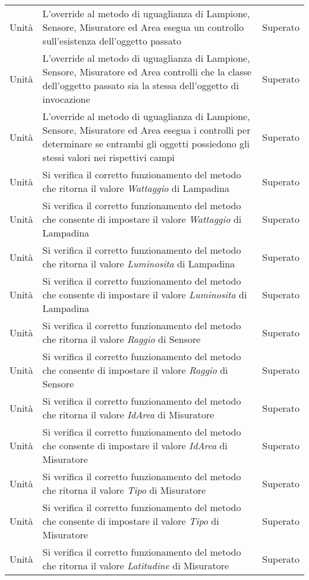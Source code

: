 \begin{center}
\begin{xltabular}{\linewidth}{|l|X|l|}
        Unità & L'override al metodo di uguaglianza di Lampione, Sensore, Misuratore ed Area esegua un controllo sull'esistenza dell'oggetto passato & Superato\\
        Unità & L'override al metodo di uguaglianza di Lampione, Sensore, Misuratore ed Area controlli che la classe dell'oggetto passato sia la stessa dell'oggetto di invocazione & Superato\\
        Unità & L'override al metodo di uguaglianza di Lampione, Sensore, Misuratore ed Area esegua i controlli per determinare se entrambi gli oggetti possiedono gli stessi valori nei rispettivi campi & Superato\\
        Unità & Si verifica il corretto funzionamento del metodo che ritorna il valore \textit{Wattaggio} di Lampadina & Superato\\
        Unità & Si verifica il corretto funzionamento del metodo che consente di impostare il valore \textit{Wattaggio} di Lampadina & Superato\\
        Unità & Si verifica il corretto funzionamento del metodo che ritorna il valore \textit{Luminosita} di Lampadina & Superato\\
        Unità & Si verifica il corretto funzionamento del metodo che consente di impostare il valore \textit{Luminosita} di Lampadina & Superato\\
        Unità & Si verifica il corretto funzionamento del metodo che ritorna il valore \textit{Raggio} di Sensore & Superato\\
        Unità & Si verifica il corretto funzionamento del metodo che consente di impostare il valore \textit{Raggio} di Sensore & Superato\\
        Unità & Si verifica il corretto funzionamento del metodo che ritorna il valore \textit{IdArea} di Misuratore & Superato\\
        Unità & Si verifica il corretto funzionamento del metodo che consente di impostare il valore \textit{IdArea} di Misuratore & Superato\\
        Unità & Si verifica il corretto funzionamento del metodo che ritorna il valore \textit{Tipo} di Misuratore & Superato\\
        Unità & Si verifica il corretto funzionamento del metodo che consente di impostare il valore \textit{Tipo} di Misuratore & Superato\\
        Unità & Si verifica il corretto funzionamento del metodo che ritorna il valore \textit{Latitudine} di Misuratore & Superato\\

\end{xltabular}
\end{center}
